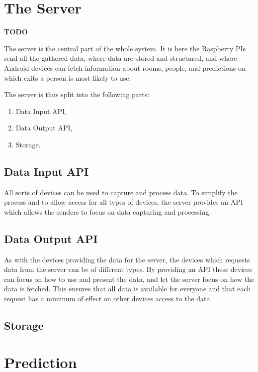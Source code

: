 \section{The Server}
{\color[rgb]{1,0,0} \textbf{\large TODO}}

The server is the central part of the whole system. It is here the Raspberry PIs send all the gathered data, where data are stored and structured, and where Android devices can fetch information about rooms, people, and predictions on which exits a person is most likely to use.

The server is thus split into the following parts:

\begin{enumerate}
	\item Data Input API,
	\item Data Output API,
	\item Storage.
\end{enumerate}


\subsection{Data Input API}
All sorts of devices can be used to capture and process data. To simplify the process and to allow access for all types of devices, the server provides an API which allows the senders to focus on data capturing and processing.

\subsection{Data Output API}
As with the devices providing the data for the server, the devices which requests data from the server can be of different types. By providing an API these devices can focus on how to use and present the data, and let the server focus on how the data is fetched. This ensures that all data is available for everyone and that each request has a minimum of effect on other devices access to the data.

\subsection{Storage}

\section{Prediction}

